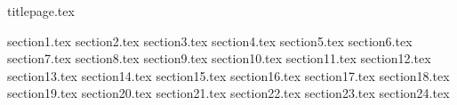 \documentclass[a4paper, 12pt]{article}
\theoremstyle{definition}
\theoremstyle{plain}
\theoremstyle{remark}
\begin{document}
  {titlepage.tex}

  \tableofcontents
  \fontsize{14pt}{20pt}\selectfont
  \newpage
  \fontsize{14pt}{20pt}\selectfont


  {section1.tex}
  {section2.tex}
  {section3.tex}
  {section4.tex}
  {section5.tex}
  {section6.tex}
  {section7.tex}
  {section8.tex}
  {section9.tex}
  {section10.tex}
  {section11.tex}
  {section12.tex}
  {section13.tex}
  {section14.tex}
  {section15.tex}
  {section16.tex}
  {section17.tex}
  {section18.tex}
  {section19.tex}
  {section20.tex}
  {section21.tex}
  {section22.tex} 
  {section23.tex}
  {section24.tex}
    
\end{document}
